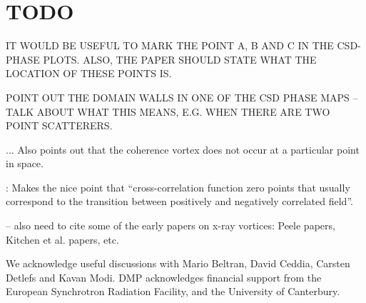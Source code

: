 \documentclass{iucr}              %
\begin{document}
\section{TODO}

IT WOULD BE USEFUL TO MARK THE POINT A, B AND C IN THE CSD-PHASE PLOTS.  ALSO, THE PAPER SHOULD STATE WHAT THE LOCATION OF THESE POINTS IS.  

POINT OUT THE DOMAIN WALLS IN ONE OF THE CSD PHASE MAPS -- TALK ABOUT WHAT THIS MEANS, E.G. WHEN THERE ARE TWO POINT SCATTERERS.


\cite{GburVisser2003}  ... Also points out that the coherence vortex does not occur at a particular point in space.    

\cite{Rodrigo2015}: Makes the nice point that ``cross-correlation function zero points that usually correspond to the transition between positively and negatively correlated field''.  




-- also need to cite some of the early papers on x-ray vortices: Peele papers, Kitchen et al. papers, etc.







We acknowledge useful discussions with Mario Beltran, David Ceddia, Carsten Detlefs and Kavan Modi. DMP acknowledges financial support from the European Synchrotron Radiation Facility, and the University of Canterbury.  




\end{document}
